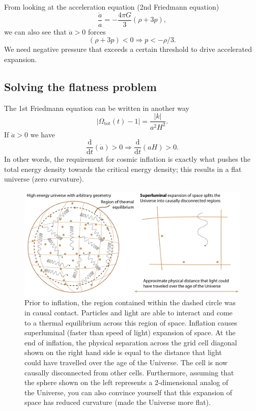 \documentclass[a4paper,12pt]{article}
\theoremstyle{remark}
\newcommand{\mrm}[1]{\mathrm{#1}}
\renewcommand{\=}[1]{\stackrel{#1}{=}} %
\theoremstyle{plain}
\theoremstyle{definition}
\begin{document}
From looking at the acceleration equation (2nd Friedmann equation) 
\begin{equation}
\frac{\ddot{a}}{a} = - \frac{4\pi G}{3}(\rho + 3p),
\end{equation}
we can also see that $\ddot{a} > 0$ forces
\begin{equation}
(\rho + 3p) < 0 \Rightarrow p < - \rho/3.
\end{equation}
We need negative pressure that exceeds a certain threshold to drive accelerated expansion.

\subsection{Solving the flatness problem}
The 1st Friedmann equation can be written in another way
\begin{equation}
| \Omega _\mrm{tot}(t) - 1| = \frac{|k|}{a^{2}H^{2}}.
\end{equation}
If $\ddot{a} > 0$ we have 
\begin{equation}
\frac{\mrm{d}}{\mrm{d}t} (\dot{a}) > 0 \Rightarrow \frac{\mrm{d}}{\mrm{d}t} (a H) > 0.
\end{equation}
In other words, the requirement for cosmic inflation is exactly what pushes the total energy density towards the critical energy density; this results in a flat universe (zero curvature).

\begin{figure}[t]
\begin{center}
    \includegraphics*[angle=0,width=1.0\textwidth]{img/inflation.png}
    \caption[Inflation.]{Prior to inflation, the region contained within the dashed circle was in causal contact. Particles and light are able to interact and come to a thermal equilibrium across this region of space. Inflation causes superluminal (faster than speed of light) expansion of space. At the end of inflation, the physical separation across the grid cell diagonal shown on the right hand side is equal to the distance that light could have travelled over the age of the Universe. The cell is now causally disconnected from other cells. Furthermore, assuming that the sphere shown on the left represents a 2-dimensional analog of the Universe, you can also convince yourself that this expansion of space has reduced curvature (made the Universe more flat).}
\label{fig:inflation}
\end{center}
\end{figure}
\end{document}

